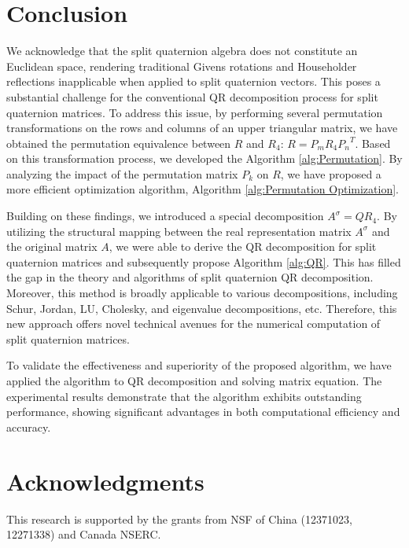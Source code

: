 \documentclass[12pt]{article}
\begin{document}
\section{Conclusion}
{\color{red}We acknowledge that the split quaternion algebra does not constitute an Euclidean space, rendering traditional Givens rotations and Householder reflections inapplicable when applied to split quaternion vectors. This poses a substantial challenge for the conventional QR decomposition process for split quaternion matrices. To address this issue, by performing several permutation transformations on the rows and columns of an upper triangular matrix, we have obtained the permutation equivalence between $R$ and $R_4$: $R = P_mR_4{P_n}^T$. Based on this transformation process, we developed the Algorithm \ref{alg:Permutation}.  By analyzing the impact of the permutation matrix $P_k$ on $R$, we have proposed a more efficient optimization algorithm, Algorithm \ref{alg:Permutation Optimization}. 

Building on these findings, we introduced a special decomposition $A^\sigma = QR_4$. By utilizing the structural mapping between the real representation matrix $A^\sigma$ and the original matrix $A$, we were able to derive the QR decomposition for split quaternion matrices and subsequently propose Algorithm \ref{alg:QR}. This has filled the gap in the theory and algorithms of split quaternion QR decomposition.  Moreover, this method is broadly applicable to various decompositions, including Schur, Jordan, LU, Cholesky, and eigenvalue decompositions, etc.  Therefore, 
this new approach offers novel technical avenues for the numerical computation of split quaternion matrices.

To validate the effectiveness and superiority of the proposed algorithm, we have applied the algorithm to QR decomposition and solving matrix equation. The experimental results demonstrate that the algorithm exhibits outstanding performance, showing significant advantages in both computational efficiency and accuracy.} 

\section{Acknowledgments}
This research is supported by the grants from NSF of China (12371023, 12271338) and Canada NSERC.
\end{document}
